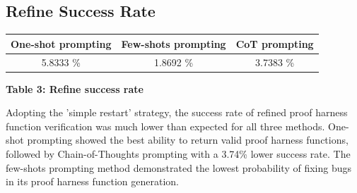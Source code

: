 \documentclass[onecolumn]{NobArticle}
\begin{document}
\vspace{11pt}
\subsection{Refine Success Rate}
\vspace{11pt}
\begin{table}[H]
    \centering
    \begin{tabular}{|c|c|c|}
    \hline
    \textbf{One-shot prompting}
         &  \textbf{Few-shots prompting}
         & \textbf{CoT prompting}
         \\ \hline
    5.8333 \% &  1.8692 \% & 3.7383 \%
    \\ \hline
    \end{tabular}
    \begin{center}
    \textbf{Table 3: Refine success rate}
    \end{center}
\end{table}

\quad Adopting the 'simple restart' strategy, the success rate of refined proof harness function verification was much lower than expected for all three methods. One-shot prompting showed the best ability to return valid proof harness functions, followed by Chain-of-Thoughts prompting with a 3.74\% lower success rate. The few-shots prompting method demonstrated the lowest probability of fixing bugs in its proof harness function generation.

\vspace{11pt}
\end{document}
